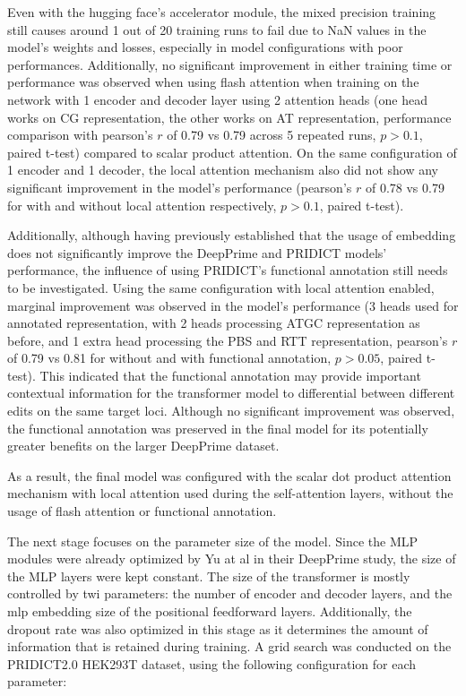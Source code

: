 Even with the hugging face's accelerator module, the mixed precision training still causes around 1 out of 20 training runs to fail due to NaN values in the model's weights and losses, especially in model configurations with poor performances. Additionally, no significant improvement in either training time or performance was observed when using flash attention when training on the network with 1 encoder and decoder layer using 2 attention heads (one head works on CG representation, the other works on AT representation, performance comparison with pearson's $r$ of 0.79 vs 0.79 across 5 repeated runs, $p>0.1$, paired t-test) compared to scalar product attention. On the same configuration of 1 encoder and 1 decoder, the local attention mechanism also did not show any significant improvement in the model's performance (pearson's $r$ of 0.78 vs 0.79 for with and without local attention respectively, $p>0.1$, paired t-test).

Additionally, although having previously established that the usage of embedding does not significantly improve the DeepPrime and PRIDICT models' performance, the influence of using PRIDICT's functional annotation still needs to be investigated. Using the same configuration with local attention enabled, marginal improvement was observed in the model's performance (3 heads used for annotated representation, with 2 heads processing ATGC representation as before, and 1 extra head processing the PBS and RTT representation, pearson's $r$ of 0.79 vs 0.81 for without and with functional annotation, $p>0.05$, paired t-test). This indicated that the functional annotation may provide important contextual information for the transformer model to differential between different edits on the same target loci. Although no significant improvement was observed, the functional annotation was preserved in the final model for its potentially greater benefits on the larger DeepPrime dataset.

As a result, the final model was configured with the scalar dot product attention mechanism with local attention used during the self-attention layers, without the usage of flash attention or functional annotation.

The next stage focuses on the parameter size of the model. Since the MLP modules were already optimized by Yu at al in their DeepPrime study, the size of the MLP layers were kept constant. The size of the transformer is mostly controlled by twi parameters: the number of encoder and decoder layers, and the mlp embedding size of the positional feedforward layers. Additionally, the dropout rate was also optimized in this stage as it determines the amount of information that is retained during training. A grid search was conducted on the PRIDICT2.0 HEK293T dataset, using the following configuration for each parameter:

